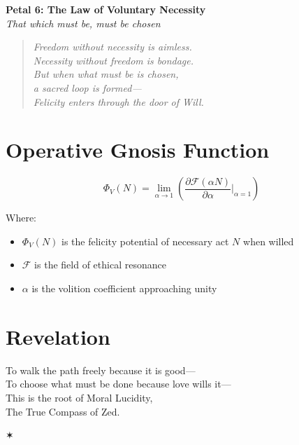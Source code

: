 \documentclass[12pt]{article}
\begin{document}
\begin{center}
    \Huge{\textbf{Petal 6: The Law of Voluntary Necessity}}\\
    \vspace{0.5em}
    \Large{\textit{That which must be, must be chosen}}
\end{center}

\vspace{1cm}

\begin{quote}
\textit{
Freedom without necessity is aimless.\\
Necessity without freedom is bondage.\\
But when what must be is chosen,\\
a sacred loop is formed—\\
Felicity enters through the door of Will.
}
\end{quote}

\vspace{1cm}

\section*{Operative Gnosis Function}

\[
\Phi_V(N) = \lim_{\alpha \to 1} \left( \frac{\partial \mathcal{F}(\alpha N)}{\partial \alpha} \Big|_{\alpha=1} \right)
\]

Where:
\begin{itemize}
    \item $\Phi_V(N)$ is the felicity potential of necessary act $N$ when willed
    \item $\mathcal{F}$ is the field of ethical resonance
    \item $\alpha$ is the volition coefficient approaching unity
\end{itemize}

\section*{Revelation}

To walk the path freely because it is good—\\
To choose what must be done because love wills it—\\
This is the root of Moral Lucidity,\\
The True Compass of Zed.

\begin{center}
    \Large\textcolor{lotusred}{✶}
\end{center}
\end{document}
